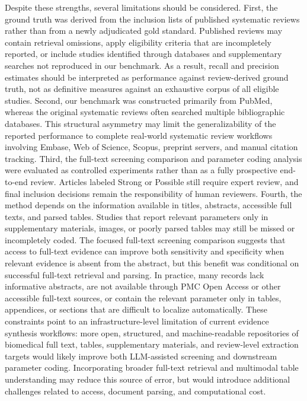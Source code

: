 Despite these strengths, several limitations should be considered. First, the ground truth was derived from the inclusion lists of published systematic reviews rather than from a newly adjudicated gold standard. Published reviews may contain retrieval omissions, apply eligibility criteria that are incompletely reported, or include studies identified through databases and supplementary searches not reproduced in our benchmark. As a result, recall and precision estimates should be interpreted as performance against review-derived ground truth, not as definitive measures against an exhaustive corpus of all eligible studies. Second, our benchmark was constructed primarily from PubMed, whereas the original systematic reviews often searched multiple bibliographic databases. This structural asymmetry may limit the generalizability of the reported performance to complete real-world systematic review workflows involving Embase, Web of Science, Scopus, preprint servers, and manual citation tracking. Third, the full-text screening comparison and parameter coding analysis were evaluated as controlled experiments rather than as a fully prospective end-to-end review. Articles labeled Strong or Possible still require expert review, and final inclusion decisions remain the responsibility of human reviewers. Fourth, the method depends on the information available in titles, abstracts, accessible full texts, and parsed tables. Studies that report relevant parameters only in supplementary materials, images, or poorly parsed tables may still be missed or incompletely coded. The focused full-text screening comparison suggests that access to full-text evidence can improve both sensitivity and specificity when relevant evidence is absent from the abstract, but this benefit was conditional on successful full-text retrieval and parsing. In practice, many records lack informative abstracts, are not available through PMC Open Access or other accessible full-text sources, or contain the relevant parameter only in tables, appendices, or sections that are difficult to localize automatically. These constraints point to an infrastructure-level limitation of current evidence synthesis workflows: more open, structured, and machine-readable repositories of biomedical full text, tables, supplementary materials, and review-level extraction targets would likely improve both LLM-assisted screening and downstream parameter coding. Incorporating broader full-text retrieval and multimodal table understanding may reduce this source of error, but would introduce additional challenges related to access, document parsing, and computational cost.

